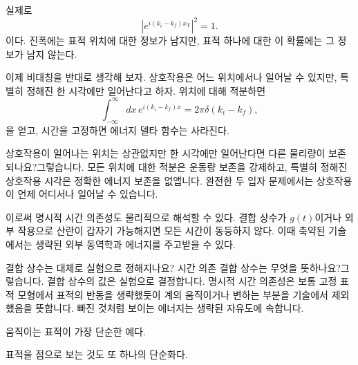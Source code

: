 실제로
\begin{equation}
\left|e^{i(k_i-k_f)x_{\mathrm T}}\right|^2=1.
\end{equation}
이다. 진폭에는 표적 위치에 대한 정보가 남지만, 표적 하나에 대한 이 확률에는 그 정보가 남지 않는다.

이제 비대칭을 반대로 생각해 보자. 상호작용은 어느 위치에서나 일어날 수 있지만, 특별히 정해진 한 시각에만 일어난다고 하자. 위치에 대해 적분하면
\begin{equation}
\int_{-\infty}^{\infty}dx\,
e^{i(k_i-k_f)x}
=2\pi\delta(k_i-k_f),
\end{equation}
을 얻고, 시간을 고정하면 에너지 델타 함수는 사라진다.

\begin{classroomqa}
상호작용이 일어나는 위치는 상관없지만 한 시각에만 일어난다면 다른 물리량이 보존되나요?\audiencequestion{}그렇습니다. 모든 위치에 대한 적분은 운동량 보존을 강제하고, 특별히 정해진 상호작용 시각은 정확한 에너지 보존을 없앱니다. 완전한 두 입자 문제에서는 상호작용이 언제 어디서나 일어날 수 있습니다.\lecturerresponse{}
\end{classroomqa}

이로써 명시적 시간 의존성도 물리적으로 해석할 수 있다. 결합 상수가 \(g(t)\)이거나 외부 작용으로 산란이 갑자기 가능해지면 모든 시간이 동등하지 않다. 이때 축약된 기술에서는 생략된 외부 동역학과 에너지를 주고받을 수 있다.

\begin{classroomqa}
결합 상수는 대체로 실험으로 정해지나요? 시간 의존 결합 상수는 무엇을 뜻하나요?\audiencequestion{}그렇습니다. 결합 상수의 값은 실험으로 결정합니다. 명시적 시간 의존성은 보통 고정 표적 모형에서 표적의 반동을 생략했듯이 계의 움직이거나 변하는 부분을 기술에서 제외했음을 뜻합니다. 빠진 것처럼 보이는 에너지는 생략된 자유도에 속합니다.\lecturerresponse{}
\end{classroomqa}

움직이는 표적이 가장 단순한 예다.

\begin{classroomqa}
\end{classroomqa}

표적을 점으로 보는 것도 또 하나의 단순화다.

